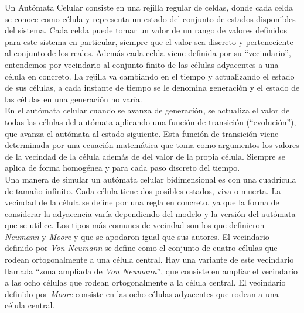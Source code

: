 Un Autómata Celular consiste en una rejilla regular de celdas, donde cada celda se conoce como célula y representa un estado del conjunto de estados disponibles del sistema. Cada celda puede tomar un valor de un rango de valores definidos para este sistema en particular, siempre que el valor sea discreto y perteneciente al conjunto de los reales. Además cada celda viene definida por su ``vecindario'', entendemos por vecindario al conjunto finito de las células adyacentes a una célula en concreto.  La rejilla va cambiando en el tiempo y actualizando el estado de sus células, a cada instante de tiempo se le denomina generación y el estado de las células en una generación no varía.  \\


En el autómata celular cuando se avanza de generación, se actualiza el valor de todas las células del autómata aplicando una función de transición (``evolución''), que avanza el autómata al estado siguiente. Esta función de transición viene determinada por una ecuación matemática que toma como argumentos los valores de la vecindad de la célula además de del valor de la propia célula. Siempre se aplica de forma homogénea y para cada paso discreto del tiempo.\\

Una manera de simular un autómata celular bidimensional es con una cuadrícula de tamaño infinito. Cada célula tiene dos posibles estados, viva o muerta. La vecindad de la célula se define por una regla en concreto, ya que la forma de considerar la adyacencia varía dependiendo del modelo y la versión del autómata que se utilice. Los tipos más comunes de vecindad son los que definieron \textit{Neumann} y \textit{Moore} y que se apodaron igual que sus autores. El vecindario definido por \textit{Von Neumann} se define como el conjunto de cuatro células que rodean ortogonalmente a una célula central. Hay una variante de este vecindario llamada ``zona ampliada de \textit{Von Neumann}'', que consiste en ampliar el vecindario a las ocho células que rodean ortogonalmente a la célula central. El vecindario definido por \textit{Moore} consiste en las ocho células adyacentes que rodean a una célula central.\\


